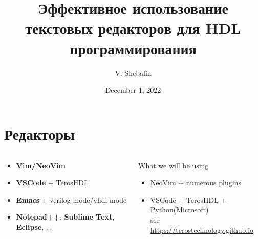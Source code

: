 \documentclass[aspectratio=169]{beamer}
\title[]{\bf Эффективное использование текстовых редакторов для HDL программирования}
\author{V. Shebalin}
\institute{\inst{}
{\textit {}}
}
\date[]{December 1,  2022}
\begin{document}
\frame{\titlepage
}

\footnotesize

\section*{Редакторы}
\begin{frame}{\secname}

  \begin{columns}
    \begin{column}{0.5\textwidth}
  \begin{itemize}
    \item {\bf Vim/NeoVim}
    \item {\bf VSCode} + TerosHDL
    \item {\bf Emacs} + verilog-mode/vhdl-mode
    \item {\bf Notepad++}, {\bf Sublime Text}, {\bf Eclipse}, ...
  \end{itemize}
      
    \end{column}
    \begin{column}{0.5\textwidth}
  \begin{block}{What we will be using}
    \begin{itemize}
      \item NeoVim + numerous plugins
      \item VSCode + TerosHDL + Python(Microsoft) \\
        see \url{https://terostechnology.github.io}
    \end{itemize}
    
  \end{block}
      
    \end{column}
  \end{columns}

\end{frame}

\end{document}
